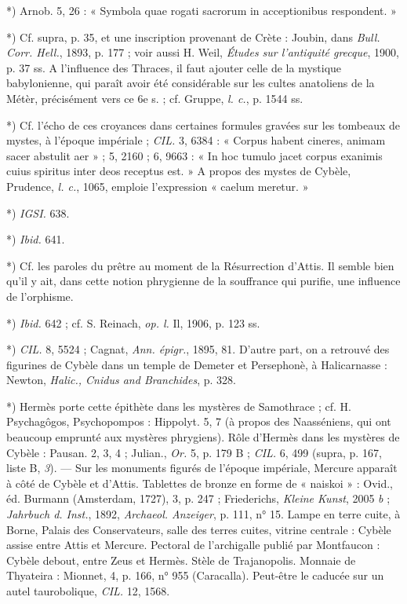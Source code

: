\documentclass[a4paper, 11pt, oneside, polutonikogreek, french]{article}
\begin{document}
*) Arnob. 5, 26 : « Symbola quae rogati sacrorum in acceptionibus respondent. »

*) Cf. supra, p. 35, et une inscription provenant de Crète : Joubin, dans \emph{Bull. Corr. Hell.}, 1893, p. 177 ; voir aussi H. Weil, \emph{Études sur l'antiquité grecque}, 1900, p. 37 ss. A l'influence des Thraces, il faut ajouter celle de la mystique babylonienne, qui paraît avoir été considérable sur les cultes anatoliens de la Métèr, précisément vers ce 6e s. ; cf. Gruppe, \emph{l. c.}, p. 1544 ss.

*) Cf. l'écho de ces croyances dans certaines formules gravées sur les tombeaux de mystes, à l'époque impériale ; \emph{CIL.} 3, 6384 : « Corpus habent cineres, animam sacer abstulit aer » ; 5, 2160 ; 6, 9663 : « In hoc tumulo jacet corpus exanimis cuius spiritus inter deos receptus est. » A propos des mystes de Cybèle, Prudence, \emph{l. c.}, 1065, emploie l'expression « caelum meretur. »

*) \emph{IGSI.} 638.

*) \emph{Ibid.} 641.

*) Cf. les paroles du prêtre au moment de la Résurrection d'Attis. Il semble bien qu'il y ait, dans cette notion phrygienne de la souffrance qui purifie, une influence de l'orphisme.

*) \emph{Ibid.} 642 ; cf. S. Reinach, \emph{op. l.} Il, 1906, p. 123 ss.

*) \emph{CIL.} 8, 5524 ; Cagnat, \emph{Ann. épigr.}, 1895, 81. D'autre part, on a retrouvé des figurines de Cybèle dans un temple de Demeter et Persephonè, à Halicarnasse : Newton, \emph{Halic., Cnidus and Branchides}, p. 328.

*) Hermès porte cette épithète dans les mystères de Samothrace ; cf. H. Psychagôgos, Psychopompos : Hippolyt. 5, 7 (à propos des Naasséniens, qui ont beaucoup emprunté aux mystères phrygiens). Rôle d'Hermès dans les mystères de Cybèle : Pausan. 2, 3, 4 ; Julian., \emph{Or.} 5, p. 179 B ; \emph{CIL.} 6, 499 (supra, p. 167, liste B, \emph{3}). --- Sur les monuments figurés de l'époque impériale, Mercure apparaît à côté de Cybèle et d'Attis. Tablettes de bronze en forme de « naiskoi » : Ovid., éd. Burmann (Amsterdam, 1727), 3, p. 247 ; Friederichs, \emph{Kleine Kunst}, 2005 \emph{b} ; \emph{Jahrbuch d. Inst.}, 1892, \emph{Archaeol. Anzeiger}, p. 111, n° 15. Lampe en terre cuite, à Borne, Palais des Conservateurs, salle des terres cuites, vitrine centrale : Cybèle assise entre Attis et Mercure. Pectoral de l'archigalle publié par Montfaucon : Cybèle debout, entre Zeus et Hermès. Stèle de Trajanopolis. Monnaie de Thyateira : Mionnet, 4, p. 166, n° 955 (Caracalla). Peut-être le caducée sur un autel taurobolique, \emph{CIL.} 12, 1568.
\end{document}
